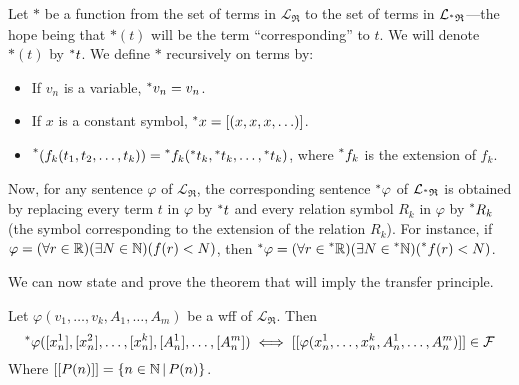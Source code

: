 Let $\ast$ be a function from the set of terms in $\mathcal{L}_\mathfrak{R}$ to the set of terms in $\mathcal{L}_{\prescript{*}{}{\mathfrak R}}$---the hope being that $\ast(t)$ will be the term ``corresponding'' to $t$. We will denote $\ast(t)$ by $\prescript{*}{}{t}$. We define $\ast$ recursively on terms by:
\begin{itemize}
    \item If $v_n$ is a variable, $\prescript{*}{}{v_n} = v_n$.
    \item If $x$ is a constant symbol, $\prescript{*}{}{x} = [(x, x, x, \ldots)]$.
    \item $\prescript{*}{}{(f_k(t_1, t_2, \ldots, t_k))} = \prescript{*}{}{f_k}(\prescript{*}{}{t_k}, \prescript{*}{}{t_k}, \ldots, \prescript{*}{}{t_k})$, where $\prescript{*}{}{f_k}$ is the extension of $f_k$.
\end{itemize}

Now, for any sentence $\varphi$ of $\mathcal{L}_\mathfrak{R}$, the corresponding sentence $\prescript{*}{}{\varphi}$ of $\mathcal{L}_{\prescript{*}{}{\mathfrak R}}$ is obtained by replacing every term $t$ in $\varphi$ by $\prescript{*}{}{t}$ and every relation symbol $R_k$ in $\varphi$ by $\prescript{*}{}{R_k}$ (the symbol corresponding to the extension of the relation $R_k$). For instance, if $\varphi = (\forall r \in \mathbb{R})(\exists N \in \mathbb{N}) (f(r) < N)$, then $\prescript{*}{}{\varphi} = (\forall r \in \prescript{*}{}{\mathbb{R}})(\exists N \in \prescript{*}{}{\mathbb{N}}) (\prescript{*}{}{f}(r) < N)$. 

We can now state and prove the theorem that will imply the transfer principle.

\begin{thm}[\L o\'s's Theorem]\label{LosTheorem}
    Let $\varphi(v_1, \ldots, v_k, A_1, \ldots, A_m)$ be a wff of $\mathcal{L}_\mathfrak{R}$. Then 
    \[\prescript{*}{}{\varphi}([x^1_n], [x^2_n], \ldots, [x^k_n], [A^1_n], \ldots, [A^m_n]) \iff [[\varphi(x^1_n, \ldots, x^k_n, A^1_n, \ldots, A^m_n)]] \in \mathcal{F}\]
    Where $[[P(n)]] = \{n \in \mathbb{N} \,|\, P(n)\}$.
\end{thm}

